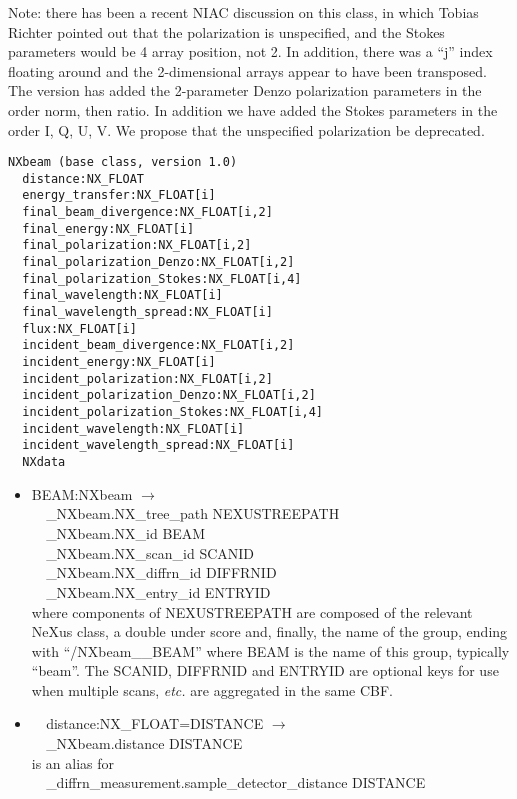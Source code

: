 \documentclass[11pt]{article}
\begin{document}
{{Note:  there has been a recent NIAC discussion on this class, in which Tobias Richter pointed out that
the polarization is unspecified, and the Stokes parameters would be 4 array position, not 2.  In addition,
there was a ``j'' index floating around and the 2-dimensional arrays appear to have been transposed.
The version has added the 2-parameter Denzo polarization parameters in the order
norm, then ratio.  In addition we have added the Stokes parameters in the order I, Q, U, V.
We propose that the unspecified polarization be deprecated.


\begin{verbatim}
NXbeam (base class, version 1.0)
  distance:NX_FLOAT
  energy_transfer:NX_FLOAT[i]
  final_beam_divergence:NX_FLOAT[i,2]
  final_energy:NX_FLOAT[i]
  final_polarization:NX_FLOAT[i,2]
  final_polarization_Denzo:NX_FLOAT[i,2]
  final_polarization_Stokes:NX_FLOAT[i,4]
  final_wavelength:NX_FLOAT[i]
  final_wavelength_spread:NX_FLOAT[i]
  flux:NX_FLOAT[i]
  incident_beam_divergence:NX_FLOAT[i,2]
  incident_energy:NX_FLOAT[i]
  incident_polarization:NX_FLOAT[i,2]
  incident_polarization_Denzo:NX_FLOAT[i,2]
  incident_polarization_Stokes:NX_FLOAT[i,4]
  incident_wavelength:NX_FLOAT[i]
  incident_wavelength_spread:NX_FLOAT[i]
  NXdata
\end{verbatim}

\begin{itemize}

\item{BEAM:NXbeam $\rightarrow$\\
\verb|  |\_NXbeam.NX\_tree\_path    NEXUSTREEPATH \\
\verb|  |\_NXbeam.NX\_id            BEAM\\
\verb|  |\_NXbeam.NX\_scan\_id      SCANID \\
\verb|  |\_NXbeam.NX\_diffrn\_id    DIFFRNID \\
\verb|  |\_NXbeam.NX\_entry\_id     ENTRYID \\
where components of NEXUSTREEPATH are composed of the
relevant NeXus class, a double under score and, finally, the
name of the group, ending with ``/NXbeam\_\_BEAM''
where BEAM is the name of this group, typically ``beam''.
The SCANID, DIFFRNID and ENTRYID are optional keys for use
when multiple scans, {\it etc.} are aggregated in the same CBF.}

\item{\verb|  |distance:NX\_FLOAT=DISTANCE $\rightarrow$\\
\verb|  |\_NXbeam.distance DISTANCE\\
is an alias for\\
\verb|  |\_diffrn\_measurement.sample\_detector\_distance DISTANCE}


\end{itemize}}}
\end{document}
